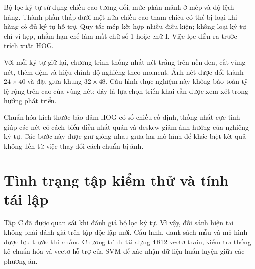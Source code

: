 Bộ lọc ký tự sử dụng chiều cao tương đối, mức phân mảnh ở mép và độ lệch hàng. Thành phần thấp dưới một nửa chiều cao tham chiếu có thể bị loại khi hàng có đủ ký tự hỗ trợ. Quy tắc mép kết hợp nhiều điều kiện; không loại ký tự chỉ vì hẹp, nhằm hạn chế làm mất chữ số 1 hoặc chữ I. Việc lọc diễn ra trước trích xuất HOG.

Với mỗi ký tự giữ lại, chương trình thống nhất nét trắng trên nền đen, cắt vùng nét, thêm đệm và hiệu chỉnh độ nghiêng theo moment. Ảnh nét được đổi thành $24\times40$ và đặt giữa khung $32\times48$. Cấu hình thực nghiệm này không bảo toàn tỷ lệ rộng trên cao của vùng nét; đây là lựa chọn triển khai cần được xem xét trong hướng phát triển.


Chuẩn hóa kích thước bảo đảm HOG có số chiều cố định, thống nhất cực tính giúp các nét có cách biểu diễn nhất quán và deskew giảm ảnh hưởng của nghiêng ký tự. Các bước này được giữ giống nhau giữa hai mô hình để khác biệt kết quả không đến từ việc thay đổi cách chuẩn bị ảnh.

\section{Tình trạng tập kiểm thử và tính tái lập}
Tập C đã được quan sát khi đánh giá bộ lọc ký tự. Vì vậy, đối sánh hiện tại không phải đánh giá trên tập độc lập mới. Cấu hình, danh sách mẫu và mô hình được lưu trước khi chấm. Chương trình tái dựng 4\,812 vectơ train, kiểm tra thống kê chuẩn hóa và vectơ hỗ trợ của SVM để xác nhận dữ liệu huấn luyện giữa các phương án.

